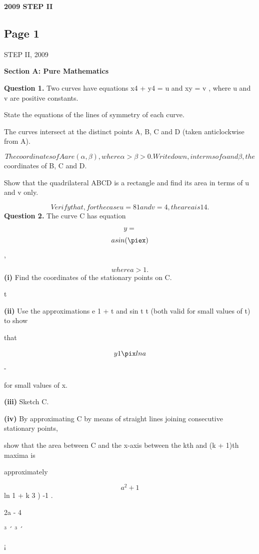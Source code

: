 \documentclass[12pt]{article}
\begin{document}
\begin{center}
{\Large \textbf{2009 STEP II}}
\end{center}

\subsection*{Page 1}
\begin{flushleft}
STEP II, 2009\par
\bigskip\textbf{Section A: Pure Mathematics}\par
\bigskip\textbf{Question 1.} Two curves have equations x4 + y4 = u and xy = v , where u and v are positive constants.\par
State the equations of the lines of symmetry of each curve.\par
The curves intersect at the distinct points A, B, C and D (taken anticlockwise from A).\par
\[The coordinates of A are (α, β), where α > β > 0. Write down, in terms of α and β, the\]
coordinates of B, C and D.\par
Show that the quadrilateral ABCD is a rectangle and find its area in terms of u and v only.\par
\[Verify that, for the case u = 81 and v = 4, the area is 14.\]
\bigskip\textbf{Question 2.} The curve C has equation\par
\[y =\]
\[asin(\piex)\]
,\par
\[where a > 1.\]
\textbf{(i)} Find the coordinates of the stationary points on C.\par
t\par
\textbf{(ii)} Use the approximations e 1 + t and sin t t (both valid for small values of t) to show\par
\approx \approx\par
that\par
\[y 1 \pix ln a\]
\approx -\par
for small values of x.\par
\textbf{(iii)} Sketch C.\par
\textbf{(iv)} By approximating C by means of straight lines joining consecutive stationary points,\par
show that the area between C and the x-axis between the kth and (k + 1)th maxima is\par
approximately\par
\[a^2 + 1\]
ln 1 + k 3 ) -1 .\par
2a - 4\par
³ ´ ³ ´\par
¡\par
\end{flushleft}
\end{document}
